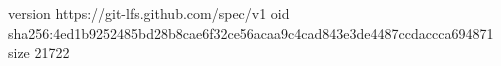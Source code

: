 version https://git-lfs.github.com/spec/v1
oid sha256:4ed1b9252485bd28b8cae6f32ce56acaa9c4cad843e3de4487ccdaccca694871
size 21722
